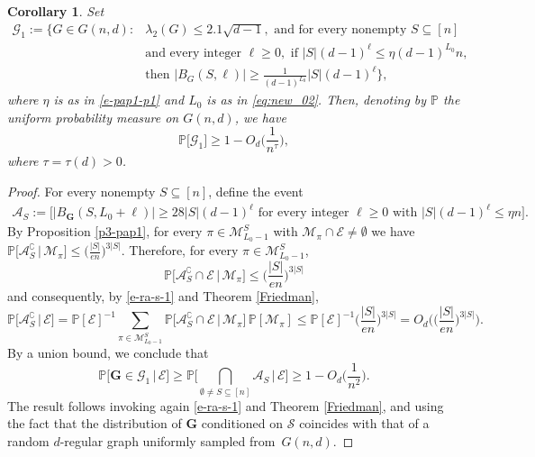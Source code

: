 \documentclass[11pt,leqno]{amsart}
\newtheorem{corollary}[theorem]{Corollary}
\theoremstyle{remark}
\theoremstyle{plain}
\begin{document}
\begin{corollary}\label{cor_new_cond_E}
Set
\begin{align} \label{eq:new_08}
\mathcal{G}_1:= \Big\{ G\in G(n,d) \colon & \lambda_2(G) \leqslant 2.1\sqrt{d-1},
\text{ and for every nonempty } S\subseteq [n] \\
& \text{and every integer } \ell\geqslant 0, \text{ if } |S|(d-1)^\ell\leqslant \eta(d-1)^{L_0} n, \nonumber \\
& \text{then } \big| B_G(S,\ell)\big| \geqslant \frac{1}{(d-1)^{L_0}} |S|(d-1)^\ell \Big\}, \nonumber
\end{align}
where $\eta$ is as in \eqref{e-pap1-p1} and $L_0$ is as in \eqref{eq:new_02}. Then, denoting by
$\mathbb{P}$ the uniform probability measure on $G(n,d)$, we have
\begin{equation} \label{eq:new_07}
\mathbb{P}[\mathcal{G}_1\big]  \geqslant 1- O_d\Big(\frac{1}{n^\tau}\Big),
\end{equation}
where $\tau=\tau(d)>0$.
\end{corollary}
\begin{proof}
For every nonempty $S\subseteq[n]$, define the event
\begin{align*}
\mathcal{A}_S:= \Big[ \big| B_\mathbf{G}(S,L_0+\ell)\big| \geqslant 28 |S|(d-1)^\ell
\text{ for every integer } \ell\geqslant 0 \text{ with } |S|(d-1)^\ell\leqslant \eta n\Big].
\end{align*}
By Proposition \ref{p3-pap1}, for every $\pi\in\mathcal{M}^S_{L_0-1}$ with $\mathcal{M}_\pi\cap\mathcal{E}\neq\emptyset$
we have $\mathbb{P}\big[\mathcal{A}_S^\complement \, \big| \, \mathcal{M}_\pi \big] \leqslant \big(\frac{|S|}{en}\big)^{3|S|}$.
Therefore, for every $\pi\in\mathcal{M}^S_{L_0-1}$,
\[ \mathbb{P} \big[\mathcal{A}_S^\complement \cap \mathcal{E} \, \big| \, \mathcal{M}_\pi \big]
\leqslant \Big(\frac{|S|}{en}\Big)^{3|S|}  \]
and consequently, by \eqref{e-ra-s-1} and Theorem \ref{Friedman},
\[ \mathbb{P} \big[\mathcal{A}_S^\complement \, \big| \, \mathcal{E} \big] =
\mathbb{P}[\mathcal{E}]^{-1}\sum_{\pi\in\mathcal{M}^S_{L_0-1}}
\mathbb{P}\big[\mathcal{A}_S^\complement \cap \mathcal{E} \, \big| \, \mathcal{M}_\pi \big]\,
\mathbb{P}[\mathcal{M}_\pi] \leqslant
\mathbb{P}[\mathcal{E}]^{-1} \Big(\frac{|S|}{en}\Big)^{3|S|} =O_d\bigg( \Big(\frac{|S|}{en}\Big)^{3|S|}\bigg). \]
By a union bound,  we conclude that
\begin{equation} \label{eq:new_09}
\mathbb{P} \big[ \mathbf{G} \in\mathcal{G}_1  \, \big| \, \mathcal{E} \big] \geqslant
\mathbb{P} \bigg[ \bigcap_{\emptyset\neq S\subseteq[n]} \mathcal{A}_S \, \bigg| \, \mathcal{E} \bigg]
 \geqslant 1- O_d\Big(\frac{1}{n^2}\Big).
\end{equation}
The result follows invoking again \eqref{e-ra-s-1} and Theorem \ref{Friedman}, and using the fact that the distribution of $\mathbf{G}$
conditioned on $\mathcal{S}$ coincides with that of a random $d$-regular graph uniformly sampled from~$G(n,d)$.
\end{proof}
\end{document}
